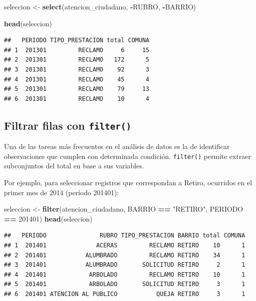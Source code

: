 \documentclass[]{book}
\newenvironment{Shaded}{\begin{snugshade}}{\end{snugshade}}
\newcommand{\KeywordTok}[1]{\textcolor[rgb]{0.13,0.29,0.53}{\textbf{#1}}}
\newcommand{\DecValTok}[1]{\textcolor[rgb]{0.00,0.00,0.81}{#1}}
\newcommand{\StringTok}[1]{\textcolor[rgb]{0.31,0.60,0.02}{#1}}
\newcommand{\OperatorTok}[1]{\textcolor[rgb]{0.81,0.36,0.00}{\textbf{#1}}}
\newcommand{\NormalTok}[1]{#1}
\begin{document}
\begin{Shaded}
\begin{Highlighting}[]
\NormalTok{seleccion <-}\StringTok{ }\KeywordTok{select}\NormalTok{(atencion_ciudadano, }\OperatorTok{-}\NormalTok{RUBRO, }\OperatorTok{-}\NormalTok{BARRIO)}

\KeywordTok{head}\NormalTok{(seleccion)}
\end{Highlighting}
\end{Shaded}

\begin{verbatim}
##   PERIODO TIPO_PRESTACION total COMUNA
## 1  201301         RECLAMO     6     15
## 2  201301         RECLAMO   172      5
## 3  201301         RECLAMO    92      3
## 4  201301         RECLAMO    45      4
## 5  201301         RECLAMO    79     13
## 6  201301         RECLAMO    10      4
\end{verbatim}

\subsection{\texorpdfstring{Filtrar filas con
\texttt{filter()}}{Filtrar filas con filter()}}\label{filtrar-filas-con-filter}

Una de las tareas más frecuentes en el análisis de datos es la de
identificar observaciones que cumplen con determinada condición.
\texttt{filter()} permite extraer subconjuntos del total en base a sus
variables.

Por ejemplo, para seleccionar registros que correspondan a Retiro,
ocurridos en el primer mes de 2014 (período 201401):

\begin{Shaded}
\begin{Highlighting}[]
\NormalTok{seleccion <-}\StringTok{ }\KeywordTok{filter}\NormalTok{(atencion_ciudadano, BARRIO }\OperatorTok{==}\StringTok{ "RETIRO"}\NormalTok{, PERIODO }\OperatorTok{==}\StringTok{ }\DecValTok{201401}\NormalTok{)}
\KeywordTok{head}\NormalTok{(seleccion)}
\end{Highlighting}
\end{Shaded}

\begin{verbatim}
##   PERIODO               RUBRO TIPO_PRESTACION BARRIO total COMUNA
## 1  201401              ACERAS         RECLAMO RETIRO    10      1
## 2  201401           ALUMBRADO         RECLAMO RETIRO    34      1
## 3  201401           ALUMBRADO       SOLICITUD RETIRO     2      1
## 4  201401            ARBOLADO         RECLAMO RETIRO    10      1
## 5  201401            ARBOLADO       SOLICITUD RETIRO     3      1
## 6  201401 ATENCION AL PUBLICO           QUEJA RETIRO     3      1
\end{verbatim}
\end{document}
